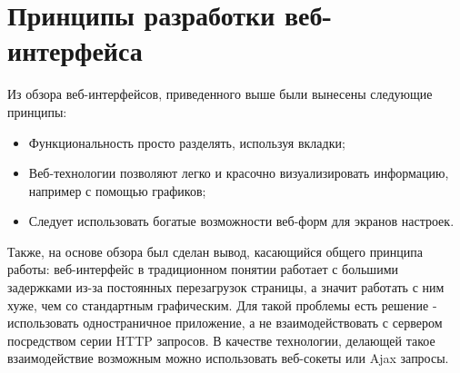 \section{Принципы разработки веб-интерфейса} \label{sect1_6}

Из обзора веб-интерфейсов, приведенного выше были вынесены следующие принципы:

\begin{itemize}
  \item Функциональность просто разделять, используя вкладки;
  \item Веб-технологии позволяют легко и красочно визуализировать информацию, например с помощью графиков;
  \item Следует использовать богатые возможности веб-форм для экранов настроек.
\end{itemize}

Также, на основе обзора был сделан вывод, касающийся общего принципа работы: веб-интерфейс в традиционном понятии работает с большими задержками из-за постоянных перезагрузок страницы, а значит работать с ним хуже, чем со стандартным графическим. Для такой проблемы есть решение - использовать одностраничное приложение, а не взаимодействовать с сервером посредством серии HTTP запросов. В качестве технологии, делающей такое взаимодействие возможным можно использовать веб-сокеты или Ajax запросы.
















